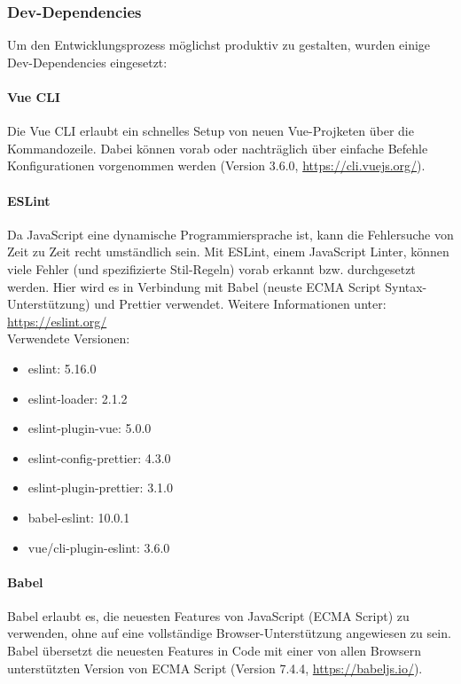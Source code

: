 \subsubsection{Dev-Dependencies}
Um den Entwicklungsprozess möglichst produktiv zu gestalten, wurden einige Dev-Dependencies eingesetzt:

	\paragraph{Vue CLI}
	Die Vue CLI erlaubt ein schnelles Setup von neuen Vue-Projketen über die Kommandozeile. Dabei können vorab oder nachträglich über einfache Befehle Konfigurationen vorgenommen werden (Version 3.6.0, \url{https://cli.vuejs.org/}).

	\paragraph{ESLint}
	Da JavaScript eine dynamische Programmiersprache ist, kann die Fehlersuche von Zeit zu Zeit recht umständlich sein.
Mit ESLint, einem JavaScript Linter, können viele Fehler (und spezifizierte Stil-Regeln) vorab erkannt bzw. durchgesetzt werden. Hier wird es in Verbindung mit Babel (neuste ECMA Script Syntax-Unterstützung) und Prettier verwendet. Weitere Informationen unter: \url{https://eslint.org/}\\
Verwendete Versionen:
	\begin{itemize}
		\item eslint: 5.16.0
		\item eslint-loader: 2.1.2
		\item eslint-plugin-vue: 5.0.0
		\item eslint-config-prettier: 4.3.0
		\item eslint-plugin-prettier: 3.1.0
		\item babel-eslint: 10.0.1
		\item vue/cli-plugin-eslint: 3.6.0
	\end{itemize}

	\paragraph{Babel}
	Babel erlaubt es, die neuesten Features von JavaScript (ECMA Script) zu verwenden, ohne auf eine vollständige Browser-Unterstützung angewiesen zu sein. Babel übersetzt die neuesten Features in Code mit einer von allen Browsern unterstützten Version von ECMA Script (Version 7.4.4, \url{https://babeljs.io/}).
	
